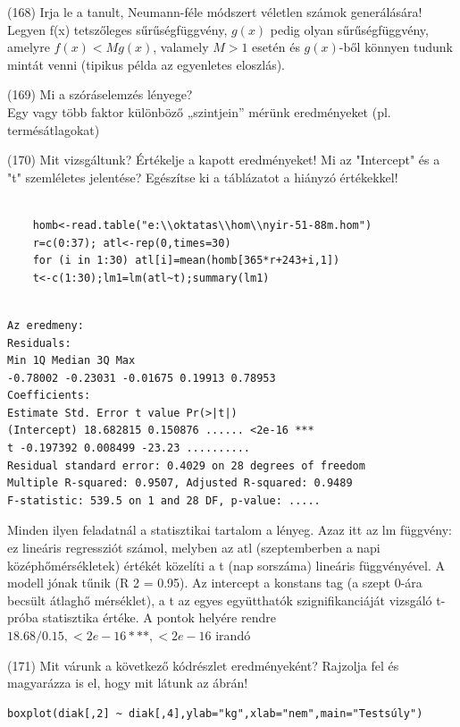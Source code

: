 \documentclass[12p]{article}
\begin{document}
(168) Irja le a tanult, Neumann-féle módszert véletlen számok generálására!\\
Legyen f(x) tetszőleges sűrűségfüggvény, $g(x)$ pedig olyan sűrűségfüggvény, amelyre $f(x) < Mg(x)$, valamely $M>1$ esetén és $g(x)$-ből könnyen tudunk mintát venni (tipikus példa az egyenletes eloszlás).

(169) Mi a szóráselemzés lényege?\\
Egy vagy több faktor különböző „szintjein” mérünk eredményeket (pl. termésátlagokat)


(170) Mit vizsgáltunk? Értékelje a kapott eredményeket! Mi az "Intercept" és a "t" szemléletes
jelentése? Egészítse ki a táblázatot a hiányzó értékekkel!

\begin{verbatim}

	homb<-read.table("e:\\oktatas\\hom\\nyir-51-88m.hom")
	r=c(0:37); atl<-rep(0,times=30)
	for (i in 1:30) atl[i]=mean(homb[365*r+243+i,1])
	t<-c(1:30);lm1=lm(atl~t);summary(lm1)
	
\end{verbatim}
\begin{verbatim}
Az eredmeny:
Residuals:
Min 1Q Median 3Q Max
-0.78002 -0.23031 -0.01675 0.19913 0.78953
Coefficients:
Estimate Std. Error t value Pr(>|t|)
(Intercept) 18.682815 0.150876 ...... <2e-16 ***
t -0.197392 0.008499 -23.23 ..........
Residual standard error: 0.4029 on 28 degrees of freedom
Multiple R-squared: 0.9507, Adjusted R-squared: 0.9489
F-statistic: 539.5 on 1 and 28 DF, p-value: .....
\end{verbatim}

Minden ilyen feladatnál a statisztikai tartalom a lényeg. Azaz itt az lm függvény: ez
lineáris regressziót számol, melyben az atl (szeptemberben a napi középhőmérsékletek) értékét közelíti a t (nap sorszáma) lineáris függvényével. A modell jónak tűnik (R
2 = 0.95). Az
intercept a konstans tag (a szept 0-ára becsült átlaghő mérséklet), a t az egyes együtthatók
szignifikanciáját vizsgáló t-próba statisztika értéke. A pontok helyére rendre $18.68/0.15, < 2e - 16 ***,
< 2e - 16$ irandó


(171) Mit várunk a következő kódrészlet eredményeként? Rajzolja fel és magyarázza is el, hogy
mit látunk az ábrán!

\begin{verbatim}
boxplot(diak[,2] ~ diak[,4],ylab="kg",xlab="nem",main="Testsúly")
\end{verbatim}
\end{document}
